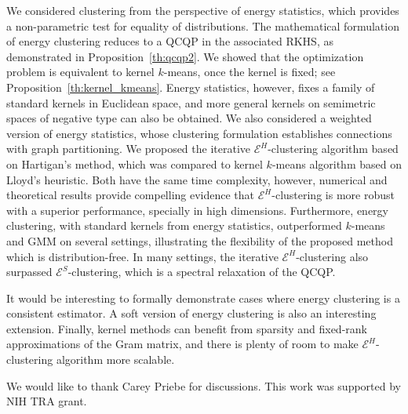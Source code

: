 \documentclass[aps,preprint,nofootinbib,floatfix]{revtex4-1}
\begin{document}
We considered clustering from the perspective of energy
statistics, which provides a non-parametric test for 
equality of distributions.
The mathematical formulation of energy clustering 
reduces to a QCQP in the associated RKHS, as demonstrated in 
Proposition~\ref{th:qcqp2}.
We showed that the optimization problem
is equivalent
to kernel $k$-means, once the kernel is fixed; see
Proposition~\ref{th:kernel_kmeans}. Energy statistics, however, fixes
a family of standard kernels in Euclidean space, and
more general kernels 
on semimetric spaces of negative type can also be obtained.
We also considered a weighted version of energy statistics, whose 
clustering formulation establishes connections with 
graph partitioning.
We proposed the iterative $\mathcal{E}^H$-clustering algorithm based on 
Hartigan's method, which was compared to kernel $k$-means algorithm
based on Lloyd's heuristic.
Both have the same time complexity, however, numerical and theoretical
results provide compelling evidence that $\mathcal{E}^H$-clustering
is more robust with a superior performance, specially in high
dimensions. 
Furthermore, energy clustering, with standard kernels from energy
statistics, outperformed $k$-means and GMM
on several settings, illustrating the flexibility
of the proposed method which is distribution-free. In many
settings, the iterative
$\mathcal{E}^H$-clustering also surpassed $\mathcal{E}^S$-clustering, which
is a spectral relaxation of the QCQP.

It would be interesting to formally 
demonstrate cases where energy clustering is a 
consistent estimator. A soft version of energy clustering is also an
interesting extension.
Finally, kernel methods can benefit from sparsity and
fixed-rank approximations of the Gram matrix, and there is plenty
of room to make $\mathcal{E}^H$-clustering algorithm more scalable.


\begin{acknowledgements}
\vspace{-1em}
We would like to thank Carey Priebe for discussions.
This work was supported by NIH TRA  grant.
\end{acknowledgements}



\end{document}
